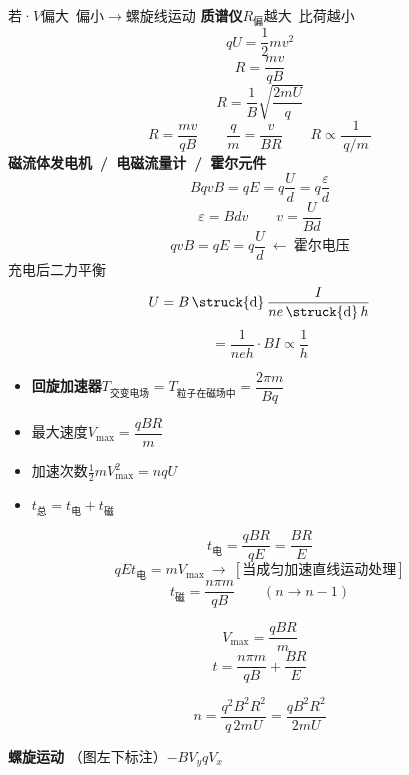 若·$V$偏大\ 偏小$\to$螺旋线运动
\textbf{质谱仪}\quad $R_{\text{偏}}$越大\ 比荷越小
\[ qU=\frac12 mv^2 \]
\[ R=\frac{mv}{qB} \]
\[ R=\frac1B\sqrt{\frac{2mU}{q}} \]
\[ R=\frac{mv}{qB}\qquad \frac{q}{m}=\frac{v}{BR}\qquad R\propto\frac{1}{\,q/m\,} \]
\textbf{磁流体发电机\ /\ 电磁流量计\ /\ 霍尔元件}
\[ BqvB=qE=q\frac{U}{d}=q\frac{\varepsilon}{d} \]
\[ \varepsilon=Bdv \qquad v=\frac{U}{Bd} \]
\[ qvB=qE=q\frac{U}{d}\ \leftarrow\ \text{霍尔电压} \]
充电后二力平衡
\[ U=B\,\text{\struck{d}}\,\frac{I}{ne\,\text{\struck{d}}\,h} \]
\[ =\frac{1}{neh}\cdot BI\propto\frac1h \]
\begin{itemize}
\item \textbf{回旋加速器}\quad $T_{\text{交变电场}}=T_{\text{粒子在磁场中}}=\dfrac{2\pi m}{Bq}$
\item 最大速度\quad $V_{\max}=\dfrac{qBR}{m}$
\item 加速次数\quad $\frac12 mV_{\max}^2=nqU$
\item $t_{\text{总}}=t_{\text{电}}+t_{\text{磁}}$
\end{itemize}
\[ t_{\text{电}}=\frac{qBR}{qE}=\frac{BR}{E} \]
\[ qEt_{\text{电}}=mV_{\max}\ \to\ [\text{当成匀加速直线运动处理}] \]
\[ t_{\text{磁}}=\frac{n\pi m}{qB}\qquad (n\to n-1) \]
\begin{keybox}
\[ V_{\max}=\frac{qBR}{m} \]
\[ t=\frac{n\pi m}{qB}+\frac{BR}{E} \]
\end{keybox}
\begin{keybox}
\[ n=\frac{q^2B^2R^2}{q\,2mU}=\frac{qB^2R^2}{2mU} \]
\end{keybox}
\textbf{螺旋运动}
（图左下标注）$-BV_yqV_x$


